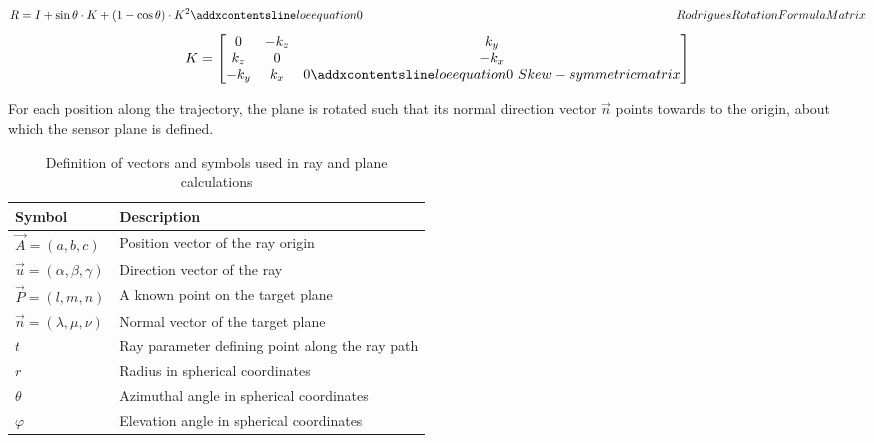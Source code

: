 \begin{equation}
R = I + \sin\theta \cdot K + (1 - \cos\theta) \cdot K^2
\label{eq:RodriguesMatrix}
\addequation{Rodrigues Rotation Formula Matrix}
\end{equation}
\begin{equation}
K = 
\begin{bmatrix}
0 & -k_z & k_y \\
k_z & 0 & -k_x \\
-k_y & k_x & 0
\addequation{Skew-symmetric matrix}
\end{bmatrix}
\end{equation}

For each position along the trajectory, the plane is rotated such that its normal direction vector $\vec{n}$ points towards to the origin, about which the sensor plane is defined.  

\begin{table}[H]
\centering
\caption{Definition of vectors and symbols used in ray and plane calculations}
\label{tab:symbols}
\begin{tabular}{ll}
\toprule
\textbf{Symbol} & \textbf{Description} \\
\midrule
$\vec{A} = (a, b, c)$ & Position vector of the ray origin \\
$\vec{u} = (\alpha, \beta, \gamma)$ & Direction vector of the ray \\
$\vec{P} = (l, m, n)$ & A known point on the target plane \\
$\vec{n} = (\lambda, \mu, \nu)$ & Normal vector of the target plane \\
$t$ & Ray parameter defining point along the ray path \\
$r$ & Radius in spherical coordinates \\
$\theta$ & Azimuthal angle in spherical coordinates \\
$\varphi$ & Elevation angle in spherical coordinates \\
\bottomrule
\end{tabular}
\end{table}